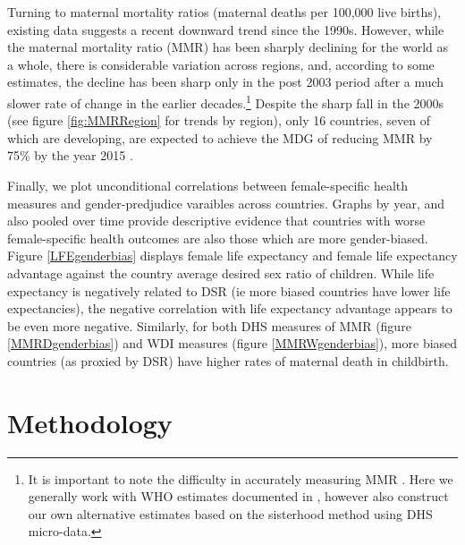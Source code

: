 \documentclass[11pt]{article}
\begin{document}
\begin{spacing}{1.4}
Turning to maternal mortality ratios (maternal deaths per 100,000 live 
births), existing data suggests a recent downward trend since the 1990s.  
However, while the maternal mortality ratio (MMR) has been sharply declining for 
the world as a whole, there is considerable variation across regions, and, 
according to some estimates, the decline has been sharp only in the post 2003 
period after a much slower rate of change in the earlier decades.\footnote{It is 
important to note the difficulty in accurately measuring MMR 
\citep{hogan2010maternal,kassebaum2014global}. Here we generally work with WHO 
estimates documented in \citet{hogan2010maternal}, however also construct our 
own alternative estimates based on the sisterhood method \citep{Grahametal2008} 
using DHS micro-data.}  Despite the sharp fall in the 2000s (see figure 
\ref{fig:MMRRegion} for trends by region), only 16 countries, seven of which are 
developing, are expected to achieve the MDG of reducing MMR by 75\% by the year 
2015 \citep{kassebaum2014global}.  

Finally, we plot unconditional correlations between female-specific health 
measures and gender-predjudice varaibles across countries.  Graphs by year, 
and also pooled over time provide descriptive evidence that countries with
worse female-specific health outcomes are also those which are more gender-biased.
Figure \ref{LFEgenderbias} displays female life expectancy and female life 
expectancy advantage against the country average desired sex ratio of children.
While life expectancy is negatively related to DSR (ie more biased countries
have lower life expectancies), the negative correlation with life expectancy 
advantage appears to be even more negative.  Similarly, for both DHS measures
of MMR (figure \ref{MMRDgenderbias}) and WDI measures (figure 
\ref{MMRWgenderbias}), more biased countries (as proxied by DSR) have higher
rates of maternal death in childbirth.

\section{Methodology}
\label{scn:methodology}

\end{spacing}
\end{document}
